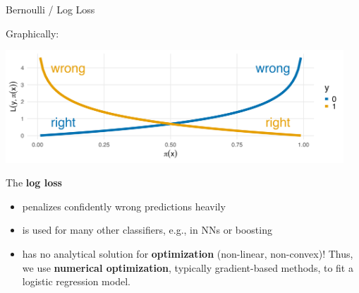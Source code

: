 \documentclass[11pt,compress,t,notes=noshow, xcolor=table]{beamer}
\begin{document}
\begin{vbframe}{Bernoulli / Log Loss}

Graphically:

{\centering \includegraphics[width=0.95\textwidth]{figure/log_loss.png}

}

The \textbf{log loss}
\begin{itemize}
  \item penalizes confidently wrong predictions heavily
  \item is used for many other classifiers, e.g., in NNs or boosting 
  \item has no analytical solution for \textbf{optimization} (non-linear, non-convex)! Thus, we use \textbf{numerical optimization}, typically gradient-based methods, to fit a logistic regression model.
\end{itemize}


\end{vbframe}
\end{document}
